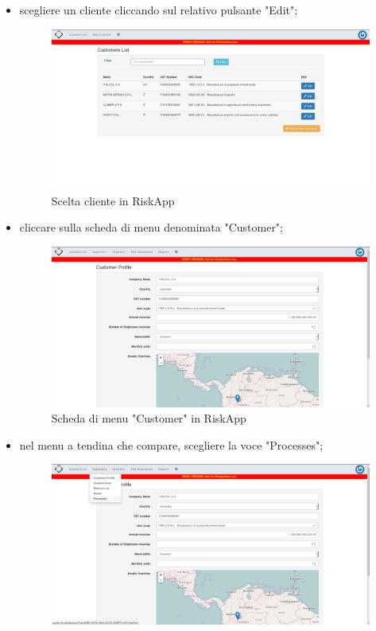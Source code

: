 \begin{itemize}
\begin{itemize}
	\end{itemize}
	\item scegliere un cliente cliccando sul relativo pulsante "Edit";
		\begin{figure}[H]
		\centering
		\includegraphics[width=\textwidth]{img/accessoDeGeOP/s2-select_customer.png}
		\caption{Scelta cliente in RiskApp}
		\end{figure}
	\item cliccare sulla scheda di menu denominata "Customer";
		\begin{figure}[H]
		\centering
		\includegraphics[width=\textwidth]{img/accessoDeGeOP/s3-customer_dashboard.png}
		\caption{Scheda di menu "Customer" in RiskApp}
		\end{figure}
	\item nel menu a tendina che compare, scegliere la voce "Processes";
		\begin{figure}[H]
		\centering
		\includegraphics[width=\textwidth]{img/accessoDeGeOP/s4-select_menu_voice.png}

\end{figure}
\end{itemize}
